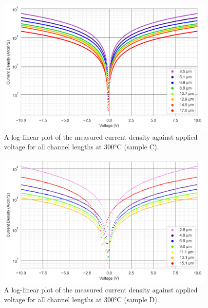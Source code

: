 \begin{refsection}
\begin{figure}[h]
    \centering
    \includegraphics[width=0.97\textwidth]{Sample C 2019/10V_Current_Density_vs_Voltage_Temperature_300_log.png}
    \caption{A log-linear plot of the measured current density against applied voltage for all channel lengths at 300\si{\degreeCelsius} (sample C).}
    \label{fig:10V_current_density_300_C}
\end{figure}
\begin{figure}[h]
    \centering
    \includegraphics[width=0.97\textwidth]{Sample D 2019/10V_Current_Density_vs_Voltage_Temperature_300_log.png}
    \caption{A log-linear plot of the measured current density against applied voltage for all channel lengths at 300\si{\degreeCelsius} (sample D).}
    \label{fig:10V_current_density_300_D}
\end{figure}

\FloatBarrier


\end{refsection}
